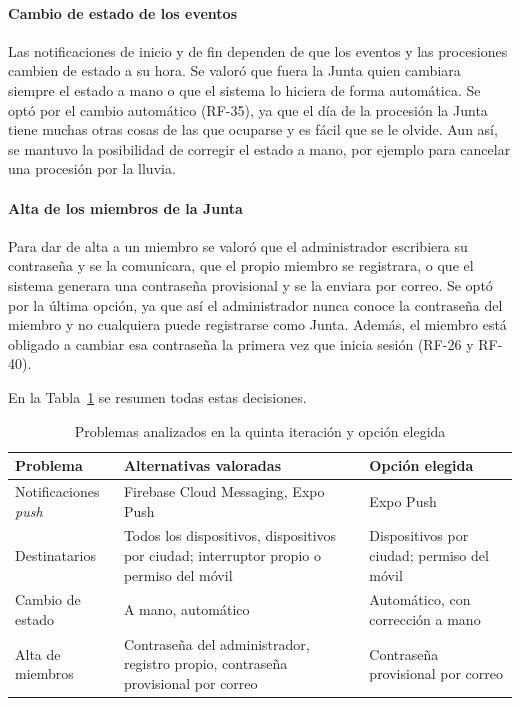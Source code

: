 \paragraph{Cambio de estado de los eventos}
Las notificaciones de inicio y de fin dependen de que los eventos y las procesiones cambien de estado a su hora. Se valoró que fuera la Junta quien cambiara siempre el estado a mano o que el sistema lo hiciera de forma automática. Se optó por el cambio automático (RF-35), ya que el día de la procesión la Junta tiene muchas otras cosas de las que ocuparse y es fácil que se le olvide. Aun así, se mantuvo la posibilidad de corregir el estado a mano, por ejemplo para cancelar una procesión por la lluvia.

\paragraph{Alta de los miembros de la Junta}
Para dar de alta a un miembro se valoró que el administrador escribiera su contraseña y se la comunicara, que el propio miembro se registrara, o que el sistema generara una contraseña provisional y se la enviara por correo. Se optó por la última opción, ya que así el administrador nunca conoce la contraseña del miembro y no cualquiera puede registrarse como Junta. Además, el miembro está obligado a cambiar esa contraseña la primera vez que inicia sesión (RF-26 y RF-40).

En la Tabla~\ref{tab:alternativasIt5} se resumen todas estas decisiones.

\begin{table}[H]
\centering
\small
\begin{tabular}{|p{3.6cm}|p{5.6cm}|p{4.4cm}|}
\hline
\textbf{Problema} & \textbf{Alternativas valoradas} & \textbf{Opción elegida} \\
\hline
Notificaciones \emph{push} & Firebase Cloud Messaging, Expo Push & Expo Push \\
\hline
Destinatarios & Todos los dispositivos, dispositivos por ciudad; interruptor propio o permiso del móvil & Dispositivos por ciudad; permiso del móvil \\
\hline
Cambio de estado & A mano, automático & Automático, con corrección a mano \\
\hline
Alta de miembros & Contraseña del administrador, registro propio, contraseña provisional por correo & Contraseña provisional por correo \\
\hline
\end{tabular}
\caption{Problemas analizados en la quinta iteración y opción elegida}
\label{tab:alternativasIt5}
\end{table}

